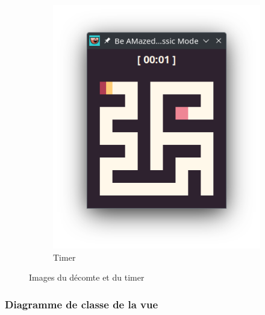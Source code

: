 \begin{figure}[!htb]
\begin{subfigure}[b]{0.3\textwidth}
        \includegraphics[width=\textwidth]{ressources/Implementation/Labyrinthe/Vue/CountdownTimer/Timer.png}
        \caption{Timer}
    \end{subfigure}

    \caption{Images du décomte et du timer}
\end{figure}


\subsubsection*{Diagramme de classe de la vue}
